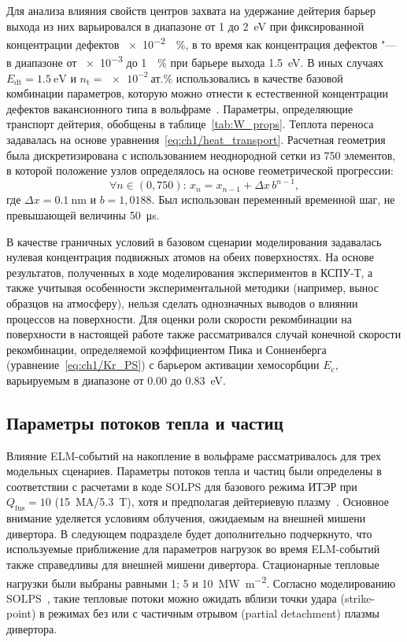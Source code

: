 Для анализа влияния свойств центров захвата на удержание дейтерия барьер выхода из них варьировался в диапазоне от \num{1} до \SI{2}{\electronvolt} при фиксированной концентрации дефектов \SI{e-2}{\percent}, в то время как концентрация дефектов "--- в диапазоне от \num{e-3} до \SI{1}{\percent} при барьере выхода \SI{1.5}{\electronvolt}. В иных случаях $E_{\mathrm{dt}}=\SI{1.5}{\electronvolt}$ и $n_{\mathrm{t}}=\SI{e-2}{\text{ат.}\percent}$ использовались в качестве базовой комбинации параметров, которую можно отнести к естественной концентрации дефектов вакансионного типа в вольфраме~\cite{DeTemmerman2018}. Параметры, определяющие транспорт дейтерия, обобщены в таблице~\cref{tab:W_props}. Теплота переноса задавалась на основе уравнения~\cref{eq:ch1/heat_transport}. Расчетная геометрия была дискретизирована с использованием неоднородной сетки из 750 элементов, в которой положение узлов определялось на основе геометрической прогрессии:
\[
	\forall n\in(0,750):\,x_{n}=x_{n-1}+\Delta x\,b^{n-1},
\]
где $\Delta x=\SI{0.1}{\nano\meter}$ и $b=1,0188$. Был использован переменный временной шаг, не превышающей величины \SI{50}{\micro\second}.

В качестве граничных условий в базовом сценарии моделирования задавалась нулевая концентрация подвижных атомов на обеих поверхностях. На основе результатов, полученных в ходе моделирования экспериментов в КСПУ-Т, а также учитывая особенности экспериментальной методики (например, вынос образцов на атмосферу), нельзя сделать однозначных выводов о влиянии процессов на поверхности. Для оценки роли скорости рекомбинации на поверхности в настоящей работе также рассматривался случай конечной скорости рекомбинации, определяемой коэффициентом Пика и Сонненберга (уравнение~\cref{eq:ch1/Kr_PS}) с барьером активации хемосорбции \( E_\mathrm{c} \), варьируемым в диапазоне от \num{0.00} до \SI{0.83}{\electronvolt}.

\subsection{Параметры потоков тепла и частиц}
Влияние ELM-событий на накопление в вольфраме рассматривалось для трех модельных сценариев. Параметры потоков тепла и частиц были определены в соответствии с расчетами в коде SOLPS для базового режима ИТЭР при $Q_\mathrm{fus}=\num{10}$ (\SI{15}{\mega\ampere}/\SI{5.3}{\tesla}), хотя и предполагая дейтериевую плазму~\cite{Pitts2019, Orrico2023}. Основное внимание уделяется условиям облучения, ожидаемым на внешней мишени дивертора. В следующем подразделе будет дополнительно подчеркнуто, что используемые приближение для параметров нагрузок во время ELM-событий также справедливы для внешней мишени дивертора. Стационарные тепловые нагрузки были выбраны равными 1; 5 и \SI{10}{\mega\watt\per\meter\squared}. Согласно моделированию SOLPS~\cite{Pitts2019, Orrico2023}, такие тепловые потоки можно ожидать вблизи точки удара (strike-point) в режимах без или с частичным отрывом (partial detachment) плазмы дивертора.

